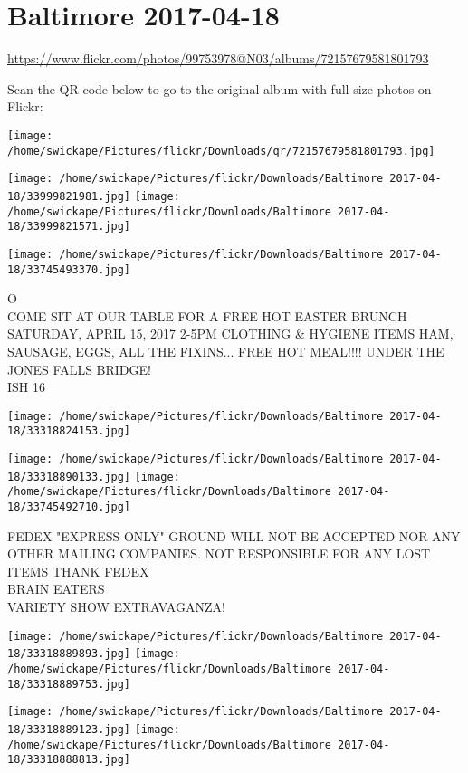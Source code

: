 \documentclass[10pt,letterpaper]{article}
\begin{document}
\section*{Baltimore 2017-04-18}

\url{https://www.flickr.com/photos/99753978@N03/albums/72157679581801793}

Scan the QR code below to go to the original album with full-size photos on Flickr:

\texttt{[image: /home/swickape/Pictures/flickr/Downloads/qr/72157679581801793.jpg]}
\pagebreak

\texttt{[image: /home/swickape/Pictures/flickr/Downloads/Baltimore 2017-04-18/33999821981.jpg]}
\texttt{[image: /home/swickape/Pictures/flickr/Downloads/Baltimore 2017-04-18/33999821571.jpg]}

\texttt{[image: /home/swickape/Pictures/flickr/Downloads/Baltimore 2017-04-18/33745493370.jpg]}

O\\
COME SIT AT OUR TABLE FOR A FREE HOT EASTER BRUNCH SATURDAY, APRIL 15, 2017 2{-}5PM CLOTHING \& HYGIENE ITEMS HAM, SAUSAGE, EGGS, ALL THE FIXINS... FREE HOT MEAL!!!! UNDER THE JONES FALLS BRIDGE!\\
ISH 16
\pagebreak

\texttt{[image: /home/swickape/Pictures/flickr/Downloads/Baltimore 2017-04-18/33318824153.jpg]}

\vspace{0.25in}
\texttt{[image: /home/swickape/Pictures/flickr/Downloads/Baltimore 2017-04-18/33318890133.jpg]}
\texttt{[image: /home/swickape/Pictures/flickr/Downloads/Baltimore 2017-04-18/33745492710.jpg]}

FEDEX "EXPRESS ONLY" GROUND WILL NOT BE ACCEPTED NOR ANY OTHER MAILING COMPANIES.  NOT RESPONSIBLE FOR ANY LOST ITEMS THANK FEDEX\\
BRAIN EATERS\\
VARIETY SHOW EXTRAVAGANZA!
\pagebreak

\texttt{[image: /home/swickape/Pictures/flickr/Downloads/Baltimore 2017-04-18/33318889893.jpg]}
\texttt{[image: /home/swickape/Pictures/flickr/Downloads/Baltimore 2017-04-18/33318889753.jpg]}

\texttt{[image: /home/swickape/Pictures/flickr/Downloads/Baltimore 2017-04-18/33318889123.jpg]}
\texttt{[image: /home/swickape/Pictures/flickr/Downloads/Baltimore 2017-04-18/33318888813.jpg]}
\end{document}
